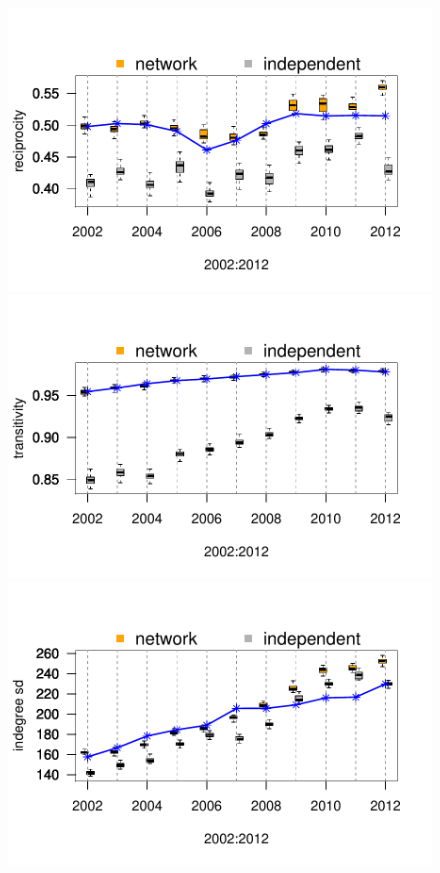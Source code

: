 \documentclass[reqno,onecolumn,letterpaper,12pt]{article}
\begin{document}
\begin{figure}[]
	\centering
	\includegraphics[scale=.75, trim = 0cm 1.5cm .1cm 0cm, clip=true  ]{figures/recip_fit.pdf}  \\
	\includegraphics[scale=.75,  trim = 0cm 1.5cm .1cm 2.4cm, clip=true]{figures/trans_fit.pdf}  \\
	\includegraphics[scale=.75, trim = 0cm 1.5cm .1cm 2.4cm, clip=true]{figures/idsd_fit.pdf}  \\

\end{figure}
\end{document}
